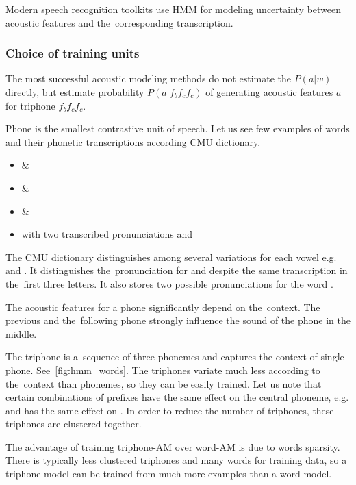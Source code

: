 {Modern speech recognition toolkits use \acl{HMM}
for modeling uncertainty between acoustic features and the~corresponding transcription. 

\subsubsection*{Choice of training units}
The most successful acoustic modeling methods do not estimate the $P(a|w)$ directly,
but estimate probability $P(a|f_{b}f_{c}f_{c})$ of generating acoustic features $a$ for triphone $f_{b}f_{c}f_{c}$.

Phone is the smallest contrastive unit of speech. 
Let us see few examples of words and their phonetic transcriptions according CMU dictionary\cite{weide1998cmu}.
\begin{itemize}
    \item {} \& 
    \item {} \& 
    \item {} \& 
    \item {} with two transcribed pronunciations  and 
\end{itemize}
The CMU dictionary distinguishes among several variations for each vowel e.g.  and .
It distinguishes the~pronunciation for  and 
despite the same transcription in the~first three letters.
It also stores two possible pronunciations for the word .

The acoustic features for a phone significantly depend on the~context.
The previous and the~following phone strongly influence the sound of the phone in the middle.

The triphone is a~sequence of three phonemes and captures the context of single phone.
See~\ref{fig:hmm_words}.
The triphones variate much less according to the~context than phonemes, so they can be easily trained.
Let us note that certain combinations of prefixes have the same effect on the central phoneme,
e.g.  and  has the same effect on . %
In order to reduce the number of triphones, these triphones are clustered together.

The advantage of training triphone-\ac{AM} over word-\ac{AM} 
is due to words sparsity. 
There is typically less clustered triphones and many words for training data,
so a triphone model can be trained from much more examples than a word model. 

}
